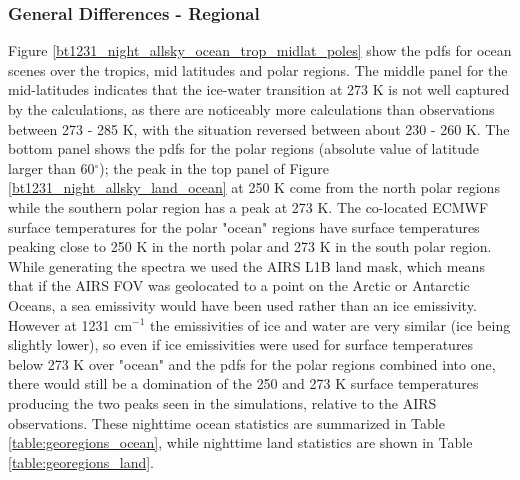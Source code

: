 \documentclass[agupp]{aguplus}              %
\newcommand{\wn}{cm$^{-1}$\xspace}
\newcommand{\mydeg}{\mbox{$^\circ$}}
\begin{document}
\begin{article}
\subsubsection{General Differences - Regional} Figure
\ref{bt1231_night_allsky_ocean_trop_midlat_poles} show the pdfs for
ocean scenes over the tropics, mid latitudes and polar regions. The
middle panel for the mid-latitudes indicates that the ice-water
transition at 273 K is not well captured by the calculations, as there
are noticeably more calculations than observations between 273 - 285
K, with the situation reversed between about 230 - 260 K. The bottom
panel shows the pdfs for the polar regions (absolute value of latitude
larger than 60\mydeg); the peak in the top panel of Figure
\ref{bt1231_night_allsky_land_ocean} at 250 K come from the north
polar regions while the southern polar region has a peak at 273 K.
The co-located ECMWF surface temperatures for the polar "ocean"
regions have surface temperatures peaking close to 250 K in the north
polar and 273 K in the south polar region. While generating the
spectra we used the AIRS L1B land mask, which means that if the AIRS
FOV was geolocated to a point on the Arctic or Antarctic Oceans, a sea
emissivity would have been used rather than an ice emissivity. However
at 1231 \wn the emissivities of ice and water are very similar (ice
being slightly lower), so even if ice emissivities were used for
surface temperatures below 273 K over "ocean" and the pdfs for the
polar regions combined into one, there would still be a domination of
the 250 and 273 K surface temperatures producing the two peaks seen in
the simulations, relative to the AIRS observations. These nighttime
ocean statistics are summarized in Table \ref{table:georegions_ocean},
while nighttime land statistics are shown in Table
\ref{table:georegions_land}.


\end{article}
\end{document}
